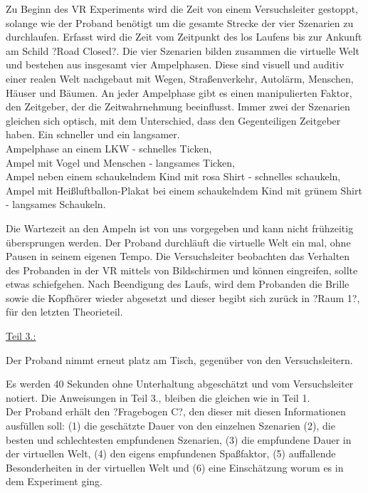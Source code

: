 \documentclass{Bericht}
\begin{document}
\par

Zu Beginn des VR Experiments wird die Zeit von einem Versuchsleiter gestoppt, solange wie der Proband benötigt um die gesamte Strecke der vier Szenarien zu durchlaufen. Erfasst wird die Zeit vom Zeitpunkt des los Laufens bis zur Ankunft am Schild ?Road Closed?. Die vier Szenarien bilden zusammen die virtuelle Welt und bestehen aus insgesamt vier Ampelphasen. Diese sind visuell und auditiv einer realen Welt nachgebaut mit Wegen, Straßenverkehr, Autolärm, Menschen, Häuser und Bäumen. An jeder Ampelphase gibt es einen manipulierten Faktor, den Zeitgeber, der die Zeitwahrnehmung beeinflusst. Immer zwei der Szenarien gleichen sich optisch, mit dem Unterschied, dass den Gegenteiligen Zeitgeber haben. Ein schneller und ein langsamer. \\

Ampelphase an einem LKW - schnelles Ticken, \\

Ampel mit Vogel und Menschen - langsames Ticken, \\

Ampel neben einem schaukelndem Kind mit rosa Shirt - schnelles schaukeln, \\

Ampel mit Heißluftballon-Plakat bei einem schaukelndem Kind mit grünem Shirt - langsames Schaukeln. 

\par

Die Wartezeit an den Ampeln ist von uns vorgegeben und kann nicht frühzeitig übersprungen werden. Der Proband durchläuft die virtuelle Welt ein mal, ohne Pausen in seinem eigenen Tempo. Die Versuchsleiter beobachten das Verhalten des Probanden in der VR mittels von Bildschirmen und können eingreifen, sollte etwas schiefgehen. Nach Beendigung des Laufs, wird dem Probanden die Brille sowie die Kopfhörer wieder abgesetzt und dieser begibt sich zurück in ?Raum 1?, für den letzten Theorieteil.

\par

\underline{Teil 3.:}

Der Proband nimmt erneut platz am Tisch, gegenüber von den Versuchsleitern. 

Es werden 40 Sekunden ohne Unterhaltung abgeschätzt und vom Versuchsleiter notiert. Die Anweisungen in Teil 3., bleiben die gleichen wie in Teil 1. \\

Der Proband erhält den ?Fragebogen C?, den dieser mit diesen Informationen ausfüllen soll:  (1) die geschätzte Dauer von den einzelnen Szenarien (2), die besten und schlechtesten empfundenen Szenarien, (3) die empfundene Dauer in der virtuellen Welt, (4) den eigens empfundenen Spaßfaktor, (5) auffallende Besonderheiten in der virtuellen Welt und (6) eine Einschätzung worum es in dem Experiment ging.  \\
\end{document}

